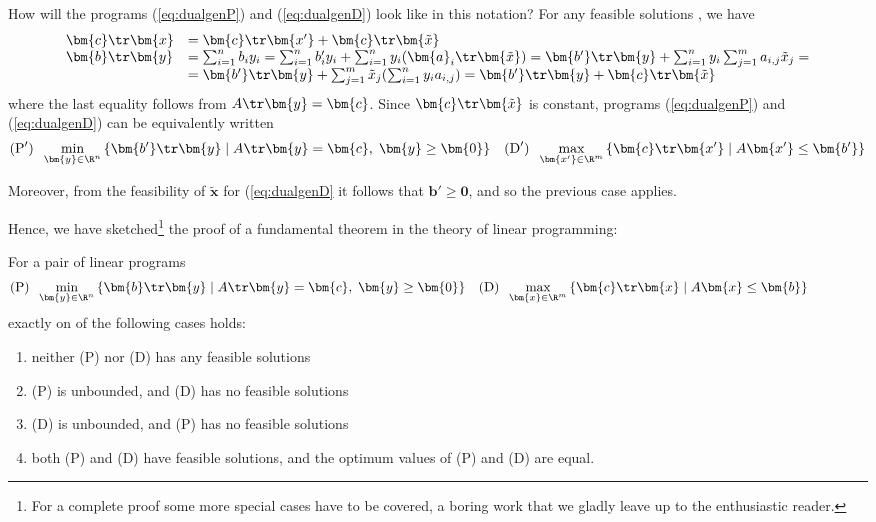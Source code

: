 \noindent
How will the programs (\ref{eq:dualgenP}) and (\ref{eq:dualgenD}) look like in this notation?
For any feasible solutions ,  we have
$$
\begin{array}{ll}
  \bm{c}\tr\bm{x} &= \bm{c}\tr\bm{x'} + \bm{c}\tr\bm{\tilde{x}}\\
  \bm{b}\tr\bm{y} &= \sum_{i=1}^nb_iy_i = \sum_{i=1}^nb'_iy_i+\sum_{i=1}^ny_i(\bm{a}_i\tr\bm{\tilde{x}})=
  \bm{b'}\tr\bm{y}+\sum_{i=1}^ny_i\sum_{j=1}^ma_{i,j}\tilde{x}_j =\\
  &= \bm{b'}\tr\bm{y}+ \sum_{j=1}^m\tilde{x}_j(\sum_{i=1}^ny_ia_{i,j}) =
  \bm{b'}\tr\bm{y}+\bm{c}\tr\bm{\tilde{x}}
\end{array}
$$
where the last equality follows from $A\tr\bm{y}=\bm{c}$.
Since $\bm{c}\tr\bm{\tilde{x}}$ is constant, programs  (\ref{eq:dualgenP}) and (\ref{eq:dualgenD})
can be equivalently written  
\begin{align*}
  (\text{P}')\;\; \min_{\bm{y}\in\R^n}\left\{ \bm{b'}\tr\bm{y} \mid A\tr\bm{y}=\bm{c},\;\bm{y}\ge\bm{0}\right\}
  &&
 (\text{D}')\;\; \max_{\bm{x'}\in\R^m}\left\{ \bm{c}\tr\bm{x'} \mid A\bm{x'}\le\bm{b'}\right\}
\end{align*}

\noindent
Moreover, from the feasibility of $\bm{\tilde{x}}$ for (\ref{eq:dualgenD} it follows that $\bm{b'}\ge\bm{0}$,
and so the previous case applies.


\noindent
Hence, we have sketched\footnote{For a complete proof some more special cases have to be covered, 
a boring work that we gladly leave up to the enthusiastic reader.} the proof of a fundamental theorem
in the theory of linear programming:

\begin{framed}
  \begin{veta}
    \label{thm:strongduality}
    For a pair of linear programs
    \begin{align*}
      \text{(P)}\;\; \min_{\bm{y}\in\R^n}\left\{ \bm{b}\tr\bm{y} \mid A\tr\bm{y}=\bm{c},\;\bm{y}\ge\bm{0}\right\}
      &&
      \text{(D)}\;\;\max_{\bm{x}\in\R^m}\left\{ \bm{c}\tr\bm{x} \mid A\bm{x}\le\bm{b}\right\}\hspace*{10ex}
    \end{align*}
    exactly on of the following cases holds:
    \begin{enumerate}
      \item neither (P) nor (D) has any feasible solutions
      \item (P) is unbounded, and (D) has no feasible solutions
      \item (D) is unbounded, and (P) has no feasible solutions
      \item both (P) and (D) have feasible solutions, and the optimum values of (P) and (D) are equal.
    \end{enumerate}
  \end{veta}
\end{framed}

